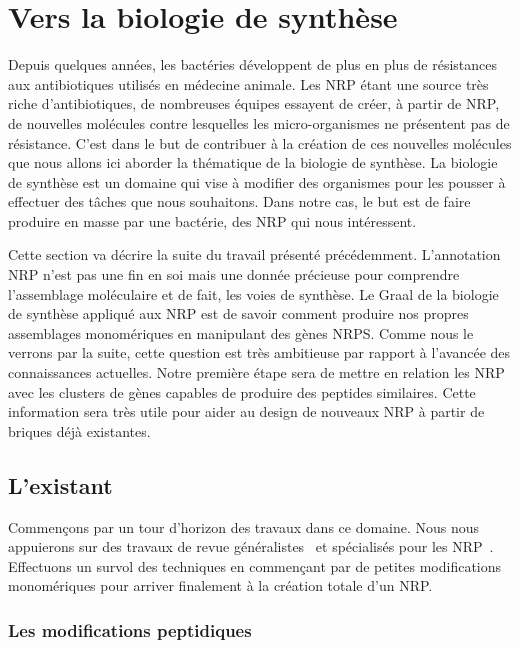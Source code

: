 \newpage
\section{Vers la biologie de synthèse}
\label{bio_synth}

Depuis quelques années, les bactéries développent de plus en plus de résistances aux antibiotiques utilisés en médecine animale.
Les NRP étant une source très riche d'antibiotiques, de nombreuses équipes essayent de créer, à partir de NRP, de nouvelles molécules contre lesquelles les micro-organismes ne présentent pas de résistance.
C'est dans le but de contribuer à la création de ces nouvelles molécules que nous allons ici aborder la thématique de la biologie de synthèse.
La biologie de synthèse est un domaine qui vise à modifier des organismes pour les pousser à effectuer des tâches que nous souhaitons.
Dans notre cas, le but est de faire produire en masse par une bactérie, des NRP qui nous intéressent.

Cette section va décrire la suite du travail présenté précédemment.
L'annotation NRP n'est pas une fin en soi mais une donnée précieuse pour comprendre l'assemblage moléculaire et de fait, les voies de synthèse.
Le Graal de la biologie de synthèse appliqué aux NRP est de savoir comment produire nos propres assemblages monomériques en manipulant des gènes NRPS.
Comme nous le verrons par la suite, cette question est très ambitieuse par rapport à l'avancée des connaissances actuelles.
Notre première étape sera de mettre en relation les NRP avec les clusters de gènes capables de produire des peptides similaires.
Cette information sera très utile pour aider au design de nouveaux NRP à partir de briques déjà existantes.


\subsection{L'existant}

Commençons par un tour d'horizon des travaux dans ce domaine.
Nous nous appuierons sur des travaux de revue généralistes~\cite{carbonell_bioinformatics_2016} et spécialisés pour les NRP~\cite{kries_biosynthetic_2016}.
Effectuons un survol des techniques en commençant par de petites modifications monomériques pour arriver finalement à la création totale d'un NRP.


\subsubsection{Les modifications peptidiques}

